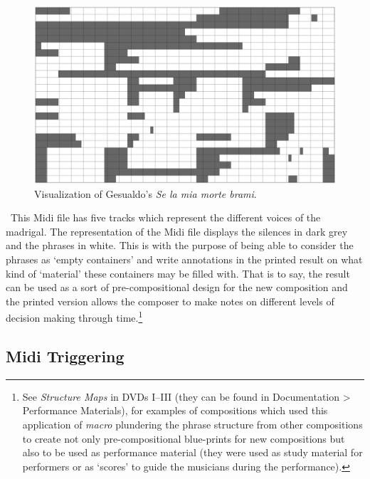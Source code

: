 \begin{figure}[htbp] %
   \centering
   \includegraphics[width=16cm]{Chapter6/midi_gesualdo.tif} %
   \caption{Visualization of Gesualdo's \emph{Se la mia morte brami}.}
   \label{fig:example}
\end{figure}\
This Midi file has five tracks which represent the different voices of the madrigal. The representation of the Midi file displays the silences in dark grey and the phrases in white. This is with the purpose of being able to consider the phrases as `empty containers' and write annotations in the printed result on what kind of `material' these containers may be filled with. That is to say, the result can be used as a sort of pre-compositional design for the new composition and the printed version allows the composer to make notes on different levels of decision making through time.\footnote{See \emph{Structure Maps} in DVDs I--III (they can be found in Documentation \tiny \textgreater \footnotesize \hspace{0pt} Performance Materials), for examples of compositions which used this application of \emph{macro} plundering the phrase structure from other compositions to create not only pre-compositional blue-prints for new compositions but also to be used as performance material (they were used as study material for performers or as `scores' to guide the musicians during the performance).}

\subsection{Midi Triggering}


